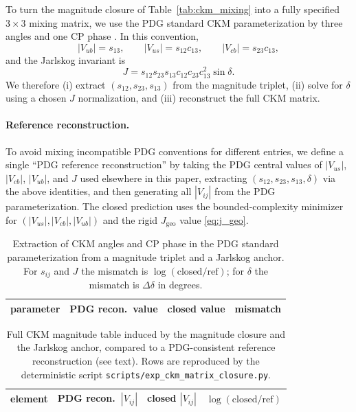 To turn the magnitude closure of Table~\ref{tab:ckm_mixing} into a fully specified $3\times 3$ mixing matrix, we use the PDG standard CKM parameterization by three angles and one CP phase \cite{PDGRPP2024}.
In this convention,
\[
|V_{ub}|=s_{13},\qquad |V_{us}|=s_{12}c_{13},\qquad |V_{cb}|=s_{23}c_{13},
\]
and the Jarlskog invariant is
\[
J=s_{12}s_{23}s_{13}c_{12}c_{23}c_{13}^2\sin\delta.
\]
We therefore (i) extract $(s_{12},s_{23},s_{13})$ from the magnitude triplet, (ii) solve for $\delta$ using a chosen $J$ normalization, and (iii) reconstruct the full CKM matrix.

\paragraph{Reference reconstruction.}
To avoid mixing incompatible PDG conventions for different entries, we define a single ``PDG reference reconstruction'' by taking the PDG central values of $|V_{us}|$, $|V_{cb}|$, $|V_{ub}|$, and $J$ used elsewhere in this paper, extracting $(s_{12},s_{23},s_{13},\delta)$ via the above identities, and then generating all $|V_{ij}|$ from the PDG parameterization.
The closed prediction uses the bounded-complexity minimizer for $(|V_{us}|,|V_{cb}|,|V_{ub}|)$ and the rigid $J_{\mathrm{geo}}$ value \eqref{eq:j_geo}.

\begin{table}[t]
\centering
\small
\setlength{\tabcolsep}{6pt}
\renewcommand{\arraystretch}{1.15}
\begin{tabular}{lrrr}
\toprule
parameter & PDG recon.\ value & closed value & mismatch \\
\midrule
%
\end{tabular}
\caption{Extraction of CKM angles and CP phase in the PDG standard parameterization from a magnitude triplet and a Jarlskog anchor. For $s_{ij}$ and $J$ the mismatch is $\log(\mathrm{closed}/\mathrm{ref})$; for $\delta$ the mismatch is $\Delta\delta$ in degrees.}
\label{tab:ckm_angles}
\end{table}

\begin{table}[t]
\centering
\small
\setlength{\tabcolsep}{6pt}
\renewcommand{\arraystretch}{1.15}
\begin{tabular}{lrrr}
\toprule
element & PDG recon.\ $|V_{ij}|$ & closed $|V_{ij}|$ & $\log(\mathrm{closed}/\mathrm{ref})$ \\
\midrule
%
\end{tabular}
\caption{Full CKM magnitude table induced by the magnitude closure and the Jarlskog anchor, compared to a PDG-consistent reference reconstruction (see text). Rows are reproduced by the deterministic script \texttt{scripts/exp\_ckm\_matrix\_closure.py}.}
\label{tab:ckm_matrix_closure}
\end{table}

